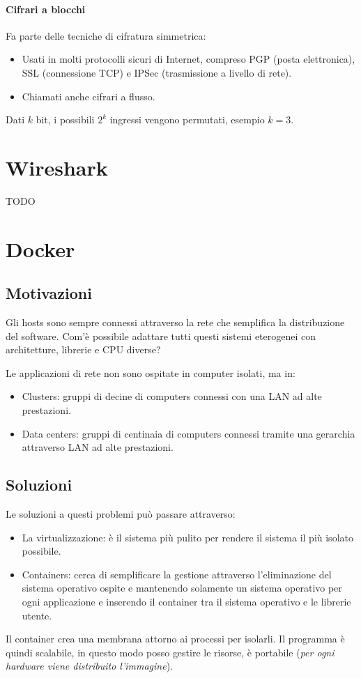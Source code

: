 \documentclass[oneside,a4paper,11pt]{book}
\theoremstyle{italicstyle}
\theoremstyle{normStyle}
\begin{document}
\subsubsection{Cifrari a blocchi}
Fa parte delle tecniche di cifratura simmetrica:
\begin{itemize}
  \item Usati in molti protocolli sicuri di Internet, compreso PGP (posta elettronica),
  SSL (connessione TCP) e IPSec (trasmissione a livello di rete).
  \item Chiamati anche cifrari a flusso.
\end{itemize}
Dati $k$ bit, i possibili $2^k$ ingressi vengono permutati, esempio $k=3$.
















\chapter{Wireshark}
TODO
\chapter{Docker}
\section{Motivazioni}
Gli hosts sono sempre connessi attraverso la rete che semplifica la distribuzione 
del software. Com'è possibile adattare tutti questi sistemi eterogenei con architetture, 
librerie e CPU diverse?

Le applicazioni di rete non sono ospitate in computer isolati, ma in:
\begin{itemize}
  \item Clusters: gruppi di decine di computers connessi con una LAN ad alte prestazioni.
  \item Data centers: gruppi di centinaia di computers connessi tramite una gerarchia 
  attraverso LAN ad alte prestazioni.
\end{itemize}
\section{Soluzioni}
Le soluzioni a questi problemi può passare attraverso:
\begin{itemize}
  \item La virtualizzazione: è il sistema più pulito per rendere il sistema il più 
  isolato possibile.
  \item Containers: cerca di semplificare la gestione attraverso l'eliminazione del sistema operativo 
  ospite e mantenendo solamente un sistema operativo per ogni applicazione e inserendo il container tra 
  il sistema operativo e le librerie utente.
\end{itemize}
Il container crea una membrana attorno ai processi per isolarli. Il programma è quindi 
scalabile, in questo modo posso gestire le risorse, è portabile (\textit{per ogni hardware viene 
distribuito l'immagine}).
\end{document}
